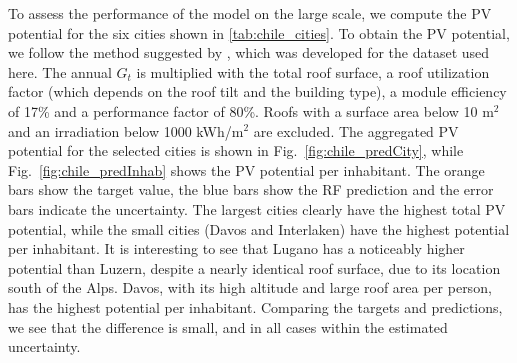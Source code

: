 To assess the performance of the model on the large scale, we compute the PV potential for the six cities shown in \ref{tab:chile_cities}. To obtain the PV potential, we follow the method suggested by \cite{portmann_sonnendach.ch:_2016}, which was developed for the dataset used here. The annual $G_t$ is multiplied with the total roof surface, a roof utilization factor (which depends on the roof tilt and the building type), a module efficiency of 17\% and a performance factor of 80\%. Roofs with a surface area below 10 m$^2$ and an irradiation below 1000 kWh/m$^2$ are excluded. The aggregated PV potential for the selected cities is shown in Fig.~\ref{fig:chile_predCity}, while Fig.~\ref{fig:chile_predInhab} shows the PV potential per inhabitant. The orange bars show the target value, the blue bars show the RF prediction and the error bars indicate the uncertainty. The largest cities clearly have the highest total PV potential, while the small cities (Davos and Interlaken) have the highest potential per inhabitant. It is interesting to see that Lugano has a noticeably higher potential than Luzern, despite a nearly identical roof surface, due to its location south of the Alps. Davos, with its high altitude and large roof area per person, has the highest potential per inhabitant. Comparing the targets and predictions, we see that the difference is small, and in all cases within the estimated uncertainty.

